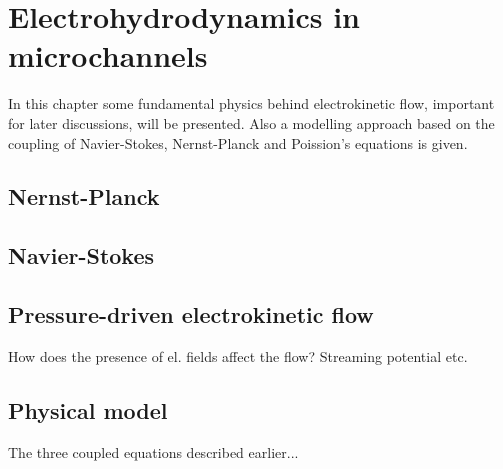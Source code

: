 \chapter{Electrohydrodynamics in microchannels}

In this chapter some fundamental physics behind electrokinetic flow,
important for later discussions, will be presented. Also a
modelling approach based on the coupling of Navier-Stokes,
Nernst-Planck and Poission's equations is given.





\section{Nernst-Planck}

\section{Navier-Stokes}

\section{Pressure-driven electrokinetic flow}
How does the presence of el. fields affect the flow?
Streaming potential etc.

\section{Physical model}
The three coupled equations described earlier...






